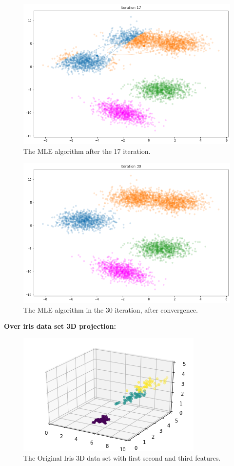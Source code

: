 \documentclass[12pt, a4paper]{paper}
\begin{document}
\newpage

\begin{figure}[h!]
\centering
\includegraphics[scale=0.4]{MLE_iter_17.png}
\caption{The MLE algorithm after the 17 iteration.}
\label{fig:MLE_2}
\end{figure}


\begin{figure}[h!]
\centering
\includegraphics[scale=0.4]{MLE_iter_30.png}
\caption{The MLE algorithm in the 30 iteration, after convergence.}
\label{fig:MLE_3}
\end{figure}

\newpage
\textbf{Over iris data set 3D projection:}

\begin{figure}[h!]
\centering
\includegraphics[scale=0.5]{MLE_iris_3D.png}
\caption{The Original Iris 3D data set with first second and third features.}
\label{fig:iris_3d_1}
\end{figure}
\end{document}
